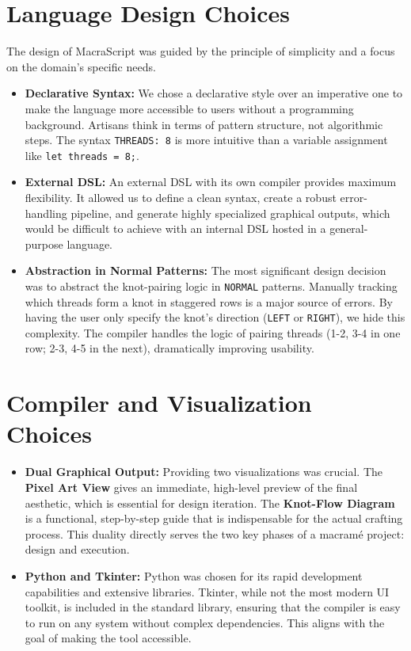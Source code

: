\documentclass[12pt,a4paper]{report}
\begin{document}
\section{Language Design Choices}
The design of MacraScript was guided by the principle of simplicity and a focus on the domain's specific needs.
\begin{itemize}
    \item \textbf{Declarative Syntax:} We chose a declarative style over an imperative one to make the language more accessible to users without a programming background. Artisans think in terms of pattern structure, not algorithmic steps. The syntax \texttt{THREADS: 8} is more intuitive than a variable assignment like \texttt{let threads = 8;}.
    \item \textbf{External DSL:} An external DSL with its own compiler provides maximum flexibility. It allowed us to define a clean syntax, create a robust error-handling pipeline, and generate highly specialized graphical outputs, which would be difficult to achieve with an internal DSL hosted in a general-purpose language.
    \item \textbf{Abstraction in Normal Patterns:} The most significant design decision was to abstract the knot-pairing logic in \texttt{NORMAL} patterns. Manually tracking which threads form a knot in staggered rows is a major source of errors. By having the user only specify the knot's direction (\texttt{LEFT} or \texttt{RIGHT}), we hide this complexity. The compiler handles the logic of pairing threads (1-2, 3-4 in one row; 2-3, 4-5 in the next), dramatically improving usability.
\end{itemize}

\section{Compiler and Visualization Choices}
\begin{itemize}
    \item \textbf{Dual Graphical Output:} Providing two visualizations was crucial. The \textbf{Pixel Art View} gives an immediate, high-level preview of the final aesthetic, which is essential for design iteration. The \textbf{Knot-Flow Diagram} is a functional, step-by-step guide that is indispensable for the actual crafting process. This duality directly serves the two key phases of a macramé project: design and execution.
    \item \textbf{Python and Tkinter:} Python was chosen for its rapid development capabilities and extensive libraries. Tkinter, while not the most modern UI toolkit, is included in the standard library, ensuring that the compiler is easy to run on any system without complex dependencies. This aligns with the goal of making the tool accessible.
\end{itemize}
\end{document}
